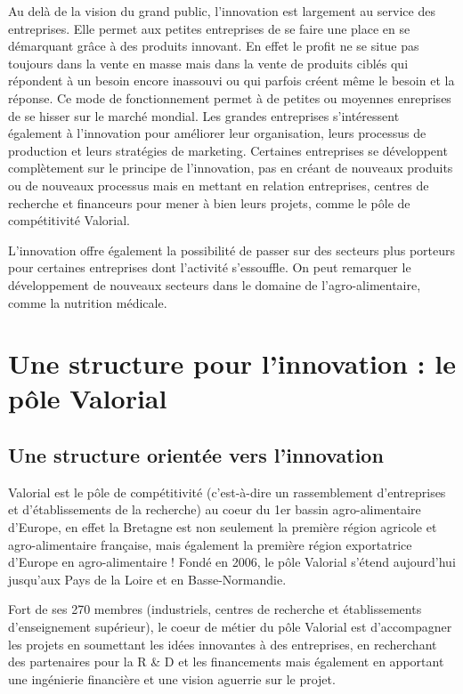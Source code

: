 \documentclass[a4paper,12pt]{report}
\begin{document}
    Au delà de la vision du grand public, l’innovation est largement au service des entreprises. Elle permet aux petites entreprises de se faire une place en se démarquant grâce à des produits innovant. En effet le profit ne se situe pas toujours dans la vente en masse mais dans la vente de produits ciblés qui répondent à un besoin encore inassouvi ou qui parfois créent même le besoin et la réponse. Ce mode de fonctionnement permet à de petites ou moyennes enreprises de se hisser sur le marché mondial.
Les grandes entreprises s’intéressent également à l’innovation pour améliorer leur organisation, leurs processus de production et leurs stratégies de marketing.
Certaines entreprises se développent complètement sur le principe de l’innovation, pas en créant de nouveaux produits ou de nouveaux processus mais en mettant en relation entreprises, centres de recherche et financeurs pour mener à bien leurs projets, comme le pôle de compétitivité Valorial.

	L’innovation offre également la possibilité de passer sur des secteurs plus porteurs pour certaines entreprises dont l’activité s'essouffle. On peut remarquer le développement de nouveaux secteurs dans le domaine de l’agro-alimentaire, comme la nutrition médicale.
			
	\section{Une structure pour l'innovation : le pôle Valorial}
		
		\subsection{Une structure orientée vers l'innovation}
			Valorial est le pôle de compétitivité (c’est-à-dire un rassemblement d’entreprises et d’établissements de la recherche) au coeur du 1er bassin agro-alimentaire d’Europe\cite{SiteValorial}, en effet la Bretagne est non seulement la première région agricole et agro-alimentaire française, mais également la première région exportatrice d’Europe en agro-alimentaire\cite{RennesAtalante} ! Fondé en 2006, le pôle Valorial s’étend aujourd’hui jusqu’aux Pays de la Loire et en Basse-Normandie.


			 Fort de ses 270 membres (industriels, centres de recherche et établissements d’enseignement supérieur), le coeur de métier du pôle Valorial est d’accompagner les projets en soumettant les idées innovantes à des entreprises, en recherchant des partenaires pour la R \& D et les financements mais également en apportant une ingénierie financière et une vision aguerrie sur le projet. 
			
\end{document}
